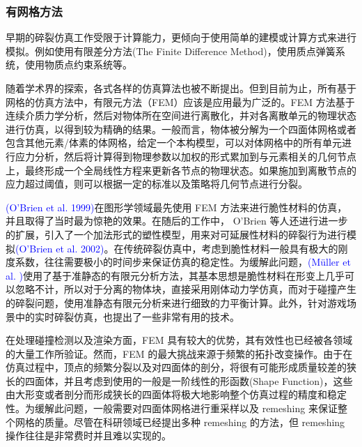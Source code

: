\subsubsection{有网格方法}

早期的碎裂仿真工作受限于计算能力，更倾向于使用简单的建模或计算方式来进行模拟。例如使用有限差分方法(The Finite Difference Method)，使用质点弹簧系统，使用物质点约束系统等。

随着学术界的探索，各式各样的仿真算法也被不断提出。但到目前为止，所有基于网格的仿真方法中，有限元方法（FEM）应该是应用最为广泛的。FEM 方法基于连续介质力学分析，然后对物体所在空间进行离散化，并对各离散单元的物理状态进行仿真，以得到较为精确的结果。一般而言，物体被分解为一个四面体网格或者包含其他元素/体素的体网格，给定一个本构模型，可以对体网格中的所有单元进行应力分析，然后将计算得到物理参数以加权的形式累加到与元素相关的几何节点上，最终形成一个全局线性方程来更新各节点的物理状态。如果施加到离散节点的应力超过阈值，则可以根据一定的标准以及策略将几何节点进行分裂。

\textcolor{blue}{(O'Brien et al. 1999)\supercite{OBrien1999}}在图形学领域最先使用 FEM 方法来进行脆性材料的仿真，并且取得了当时最为惊艳的效果。在随后的工作中， O'Brien 等人还进行进一步的扩展，引入了一个加法形式的塑性模型，用来对可延展性材料的碎裂行为进行模拟\textcolor{blue}{(O'Brien et al. 2002)\supercite{OBrien2002}}。在传统碎裂仿真中，考虑到脆性材料一般具有极大的刚度系数，往往需要极小的时间步来保证仿真的稳定性。为缓解此问题，\textcolor{blue}{(M\"{u}ller et al. )\supercite{Muller2001}}使用了基于准静态的有限元分析方法，其基本思想是脆性材料在形变上几乎可以忽略不计，所以对于分离的物体块，直接采用刚体动力学仿真，而对于碰撞产生的碎裂问题，使用准静态有限元分析来进行细致的力平衡计算。此外，针对游戏场景中的实时碎裂仿真，也提出了一些非常有用的技术。

在处理碰撞检测以及渲染方面，FEM 具有较大的优势，其有效性也已经被各领域的大量工作所验证。然而，FEM 的最大挑战来源于频繁的拓扑改变操作。由于在仿真过程中，顶点的频繁分裂以及对四面体的剖分，将很有可能形成质量较差的狭长的四面体，并且考虑到使用的一般是一阶线性的形函数(Shape Function)，这些由大形变或者剖分而形成狭长的四面体将极大地影响整个仿真过程的精度和稳定性。为缓解此问题，一般需要对四面体网格进行重采样以及 remeshing 来保证整个网格的质量。尽管在科研领域已经提出多种 remeshing 的方法，但 remeshing 操作往往是非常费时并且难以实现的。

